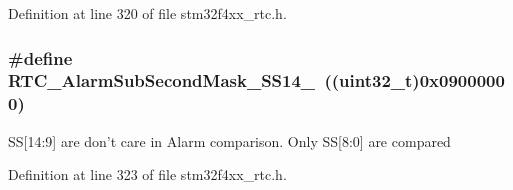 Definition at line 320 of file stm32f4xx\-\_\-rtc.\-h.

\hypertarget{group___r_t_c___alarm___sub___seconds___masks___definitions_ga4a8e2fd87578d1357ec8f169766119ec}{
\subsubsection[{R\-T\-C\-\_\-\-Alarm\-Sub\-Second\-Mask\-\_\-\-S\-S14\-\_\-9}]{\setlength{\rightskip}{0pt plus 5cm}\#define R\-T\-C\-\_\-\-Alarm\-Sub\-Second\-Mask\-\_\-\-S\-S14\-\_~((uint32\-\_\-t)0x09000000)}}\label{group___r_t_c___alarm___sub___seconds___masks___definitions_ga4a8e2fd87578d1357ec8f169766119ec}
S\-S\mbox{[}14\-:9\mbox{]} are don't care in Alarm comparison. Only S\-S\mbox{[}8\-:0\mbox{]} are compared 

Definition at line 323 of file stm32f4xx\-\_\-rtc.\-h.

